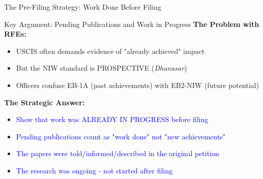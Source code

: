 \documentclass[11pt]{beamer}
\begin{document}
	\begin{frame}{The Pre-Filing Strategy: Work Done Before Filing}
		\scriptsize
		\begin{block}{Key Argument: Pending Publications and Work in Progress}
			\textbf{The Problem with RFEs:}
			\begin{itemize}
				\item USCIS often demands evidence of "already achieved" impact
				\item But the NIW standard is PROSPECTIVE (\textit{Dhanasar})
				\item Officers confuse EB-1A (past achievements) with EB2-NIW (future potential)
			\end{itemize}
			\textbf{The Strategic Answer:}
			\begin{itemize}
				\item \textcolor{blue}{Show that work was ALREADY IN PROGRESS before filing}
				\item \textcolor{blue}{Pending publications count as "work done" not "new achievements"}
				\item \textcolor{blue}{The papers were told/informed/described in the original petition}
				\item \textcolor{blue}{The research was ongoing - not started after filing}
			\end{itemize}
		\end{block}
	\end{frame}
	
\end{document}
